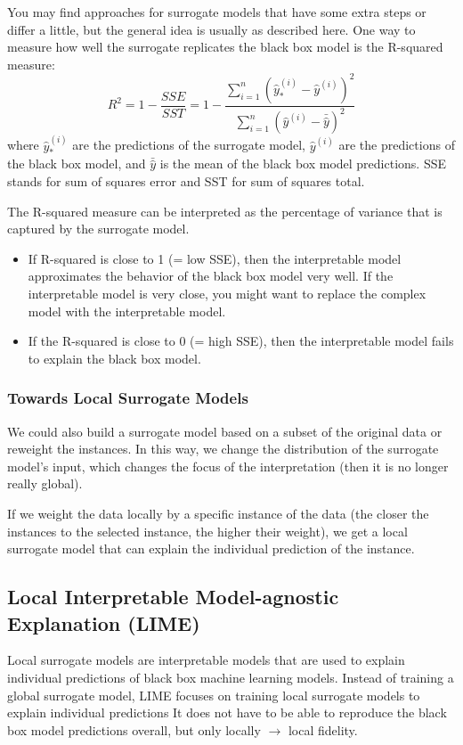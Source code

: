 You may find approaches for surrogate models that have some extra steps or differ a little, but the general idea is usually as described here.
One way to measure how well the surrogate replicates the black box model is the R-squared measure:
\begin{equation*}
    R^2=1-\frac{SSE}{SST}=1-\frac{\sum_{i=1}^n(\hat{y}_*^{(i)}-\hat{y}^{(i)})^2}{\sum_{i=1}^n(\hat{y}^{(i)}-\bar{\hat{y}})^2}
\end{equation*}
where $\hat{y}_*^{(i)}$ are the predictions of the surrogate model, $\hat{y}^{(i)}$ are the predictions of the black box model, and $\bar{\hat{y}}$ is the mean of the black box model predictions.
SSE stands for sum of squares error and SST for sum of squares total.

The R-squared measure can be interpreted as the percentage of variance that is captured by the surrogate model.
\begin{itemize}
    \item If R-squared is close to 1 (= low SSE), then the interpretable model approximates the behavior of
    the black box model very well. If the interpretable model is very close, you might want to replace the
    complex model with the interpretable model.
    \item If the R-squared is close to 0 (= high SSE), then the interpretable model fails to explain the black box model.
\end{itemize}

\subsubsection{Towards Local Surrogate Models}
We could also build a surrogate model based on a subset of the original data or reweight the instances.
In this way, we change the distribution of the surrogate model's input, which changes the focus of the interpretation (then it is no longer really global).

If we weight the data locally by a specific instance of the data (the closer the instances to the selected instance, the higher their weight), we get a local surrogate model that can explain the individual prediction of the instance.

\subsection{Local Interpretable Model-agnostic Explanation (LIME)}
Local surrogate models are interpretable models that are used to explain individual predictions of black box machine learning models.
Instead of training a global surrogate model, LIME focuses on training local surrogate models to explain individual predictions
It does not have to be able to reproduce the black box model predictions overall, but only locally $\rightarrow$ local fidelity.\\

